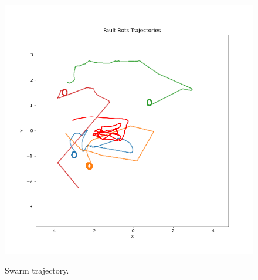 \documentclass[../../Thesis.tex]{subfiles}
\begin{document}
\begin{figure}
{							\includegraphics[scale=0.3]{../../Images/Experiments/foraging_size6x8_bot_number38_fault_10_percent_rotating_fault_after_1000/Fault_Bots_Trajectories.png}
						}
						\label{fig:foraging_swarm_trajectory}
						\caption{Swarm trajectory.}
					\end{figure}
					
\end{document}
